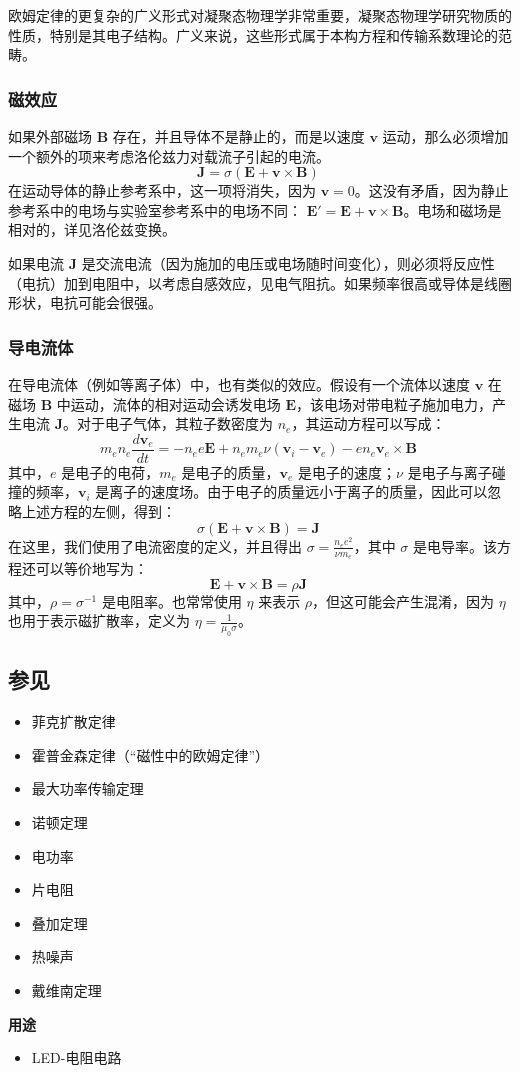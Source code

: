 欧姆定律的更复杂的广义形式对凝聚态物理学非常重要，凝聚态物理学研究物质的性质，特别是其电子结构。广义来说，这些形式属于本构方程和传输系数理论的范畴。
\subsubsection{磁效应}  
如果外部磁场 \( \mathbf{B} \) 存在，并且导体不是静止的，而是以速度 \( \mathbf{v} \) 运动，那么必须增加一个额外的项来考虑洛伦兹力对载流子引起的电流。  
\[
\mathbf{J} = \sigma (\mathbf{E} + \mathbf{v} \times \mathbf{B})~
\]  
在运动导体的静止参考系中，这一项将消失，因为 \( \mathbf{v} = 0 \)。这没有矛盾，因为静止参考系中的电场与实验室参考系中的电场不同： \( \mathbf{E'} = \mathbf{E} + \mathbf{v} \times \mathbf{B} \)。电场和磁场是相对的，详见洛伦兹变换。  

如果电流 \( \mathbf{J} \) 是交流电流（因为施加的电压或电场随时间变化），则必须将反应性（电抗）加到电阻中，以考虑自感效应，见电气阻抗。如果频率很高或导体是线圈形状，电抗可能会很强。
\subsubsection{导电流体}  
在导电流体（例如等离子体）中，也有类似的效应。假设有一个流体以速度 \( \mathbf{v} \) 在磁场 \( \mathbf{B} \) 中运动，流体的相对运动会诱发电场 \( \mathbf{E} \)，该电场对带电粒子施加电力，产生电流 \( \mathbf{J} \)。对于电子气体，其粒子数密度为 \( n_e \)，其运动方程可以写成：  
\[
m_e n_e \frac{d \mathbf{v}_e}{dt} = -n_e e \mathbf{E} + n_e m_e \nu (\mathbf{v}_i - \mathbf{v}_e) - e n_e \mathbf{v}_e \times \mathbf{B}~
\]
其中，\( e \) 是电子的电荷，\( m_e \) 是电子的质量，\( \mathbf{v}_e \) 是电子的速度；\( \nu \) 是电子与离子碰撞的频率，\( \mathbf{v}_i \) 是离子的速度场。由于电子的质量远小于离子的质量，因此可以忽略上述方程的左侧，得到：  
\[
\sigma (\mathbf{E} + \mathbf{v} \times \mathbf{B}) = \mathbf{J}~
\]
在这里，我们使用了电流密度的定义，并且得出 \( \sigma = \frac{n_e e^2}{\nu m_e} \)，其中 \( \sigma \) 是电导率。该方程还可以等价地写为：  
\[
\mathbf{E} + \mathbf{v} \times \mathbf{B} = \rho \mathbf{J}~
\]
其中，\( \rho = \sigma^{-1} \) 是电阻率。也常常使用 \( \eta \) 来表示 \( \rho \)，但这可能会产生混淆，因为 \( \eta \) 也用于表示磁扩散率，定义为 \( \eta = \frac{1}{\mu_0 \sigma} \)。
\subsection{参见}   
\begin{itemize}
\item 菲克扩散定律  
\item 霍普金森定律（“磁性中的欧姆定律”）  
\item 最大功率传输定理  
\item 诺顿定理  
\item 电功率  
\item 片电阻  
\item 叠加定理  
\item 热噪声  
\item 戴维南定理  
\end{itemize}
\textbf{用途} 
\begin{itemize}
\item LED-电阻电路
\end{itemize}

